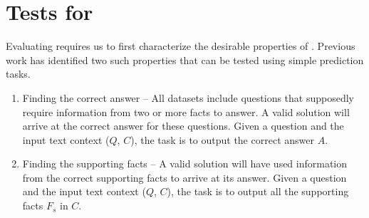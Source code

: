 \section{Tests for \MfR}


Evaluating \mfr requires us to first characterize the desirable properties of \mfr. Previous work has identified two such properties that can be tested using simple prediction tasks. %


\begin{enumerate}
\item Finding the correct answer -- All \mf datasets include questions that supposedly require information from two or more facts to answer. A valid \mfr solution will arrive at the correct answer for these questions. Given a question and the input text context ($Q$, $C$), the task is to output the correct answer $A$. 

\item Finding the supporting facts -- A valid \mfr solution will have used information from the correct supporting facts to arrive at its answer. Given a question and the input text context ($Q$, $C$), the task is to output all the supporting facts $F_s$ in $C$.
\end{enumerate}

